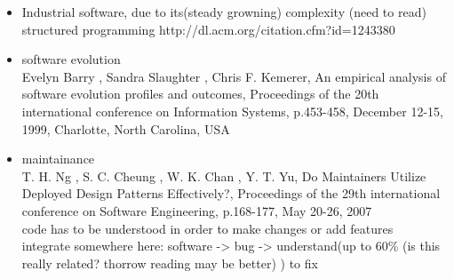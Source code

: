 \begin{itemize}

\item Industrial software, due to its(steady growning) complexity \cite{Lehman:1985:PEP:7261}(need to read) \\ structured programming http://dl.acm.org/citation.cfm?id=1243380

\item software evolution \\
	Evelyn Barry , Sandra Slaughter , Chris F. Kemerer, An empirical analysis of software evolution profiles and outcomes, Proceedings of the 20th international conference on Information Systems, p.453-458, December 12-15, 1999, Charlotte, North Carolina, USA

\item maintainance \cite{Lientz:1980:SMM:601062} \cite{ISOSWMaintainance} \\
	T. H. Ng , S. C. Cheung , W. K. Chan , Y. T. Yu, Do Maintainers Utilize Deployed Design Patterns Effectively?, Proceedings of the 29th international conference on Software Engineering, p.168-177, May 20-26, 2007 \\
	code has to be understood \cite{Boehm:1976:SE:1311958.1312684} in order to make changes or add features \cite{Singer97anexamination} \\
	integrate somewhere here: software -> bug -> understand(up to 60\% \cite{Basili:1997:EPR:257260.257262}(is this really related? thorrow reading may be better) \cite{Pigoski:1996:PSM:524398} ) to fix


\end{itemize}
